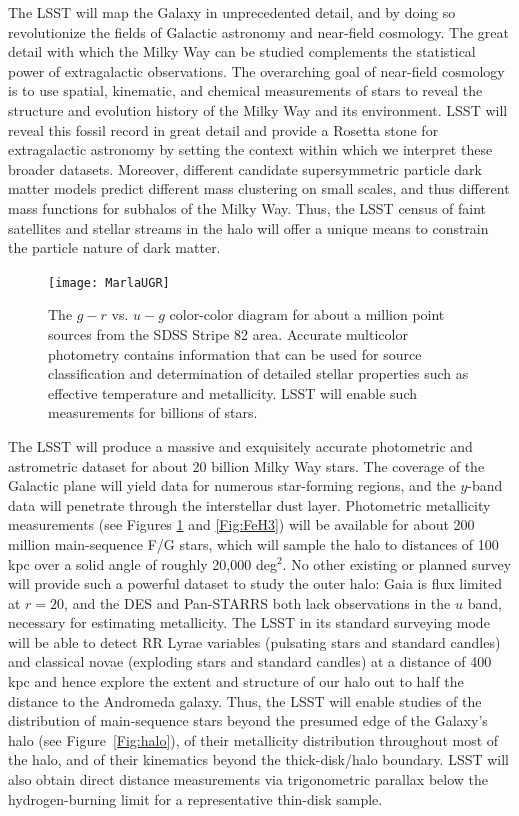 The LSST will map the Galaxy in unprecedented detail, and by doing so revolutionize the fields of Galactic
astronomy and near-field cosmology. The great detail with which the Milky Way can be studied complements
the statistical power of extragalactic observations.  The overarching goal of near-field cosmology is to use
spatial, kinematic, and chemical measurements of stars to reveal the structure and evolution history of the Milky Way
and its environment. LSST will reveal this fossil record in great detail and provide a Rosetta stone for extragalactic
astronomy by setting the context within which we interpret these
broader datasets. Moreover, different candidate supersymmetric
particle dark matter models predict different mass clustering on small
scales, and thus different mass functions for subhalos of the Milky
Way.  Thus, the LSST census of faint satellites and stellar streams in
the halo will offer a unique means to constrain the
particle nature of dark matter.


\begin{figure}
\texttt{[image: MarlaUGR]}
\caption{The $g-r$ vs. $u-g$ color-color diagram for about a million point sources
from the SDSS Stripe 82 area. Accurate multicolor photometry
contains information that can be used for source classification and determination of
detailed stellar properties such as effective temperature and metallicity. LSST will
enable such measurements for billions of stars.}
\label{Fig:FeH}
\end{figure}


The LSST will produce a massive and exquisitely accurate photometric and astrometric dataset for about 20 billion
Milky Way stars. The coverage of the Galactic plane will yield data for numerous star-forming
regions, and the $y$-band data will penetrate through the interstellar dust layer. Photometric metallicity
measurements (see Figures \ref{Fig:FeH} and \ref{Fig:FeH3}) will be available for about 200 million main-sequence
F/G stars, which will sample the halo to distances of 100 kpc
\citep{2008ApJ...684..287I,2013ApJ...763...65A} over a solid angle of
roughly 20,000 deg$^2$. No other
existing or planned survey will provide such a powerful dataset to
study the outer halo: Gaia
is flux limited at $r=20$, and the DES \citep{2011AJ....141..185R} and Pan-STARRS both
lack observations in the $u$ band, necessary for estimating metallicity. The LSST in its standard surveying mode will
be able to detect RR Lyrae variables (pulsating stars and standard candles) and classical novae (exploding stars
and standard candles) at a distance of 400 kpc and hence explore the extent and structure of our  halo out to
half the distance to the Andromeda galaxy. Thus, the LSST will enable studies of the distribution of main-sequence
stars beyond the presumed edge of the Galaxy's halo (see Figure~\ref{Fig:halo}), of their metallicity distribution
throughout most of the halo, and of their kinematics beyond the thick-disk/halo boundary. LSST will also obtain
direct distance measurements via trigonometric parallax below the hydrogen-burning limit for a representative
thin-disk sample.

